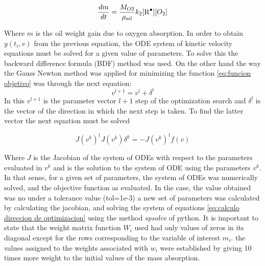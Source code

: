 \begin{refsection}
\begin{equation}
    \frac{dm}{dt} = \frac{M_{O2}}{\rho_{oil}}k_2 [\ce{R^.}][O_2]
    \label{eq:cambio_masa_aceite}
\end{equation}

Where $m$ is the oil weight gain due to oxygen absorption. In order to obtain $y(t_i,v)$ from the previous equation, the ODE system of kinetic velocity equations must be solved for a given value of parameters. To solve this the backward difference formula (BDF) method was used. On the other hand the way the Gauss Newton method was applied for minimizing the function \ref{eq:funcion objetivo} was through the next equation:
\begin{equation}
    v^{l+1}=v^l+\delta^l
\end{equation}
In this $v^{l+1}$ is the parameter vector $l+1$ step of the optimization search and $\delta^l$ is the vector of the direction in which the next step is taken. To find the latter vector the next equation must be solved 

\begin{equation}
    J(v^k)^\dagger J(v^k)\delta^k=-J(v^k)^\dagger f(v)
    \label{eq:calculo direccion de optimizacion}
\end{equation}

Where $J$ is the Jacobian of the system of ODEs with respect to the parameters evaluated in $v^k$ and is the solution to the system of ODE using the parameters $v^k$. In that sense, for a given set of parameters, the system of ODEs was numerically solved, and the objective function as evaluated. In the case, the value obtained was no under a tolerance value (tol=1e-3) a new set of parameters was calculated by calculating the jacobian, and solving the system of equations \ref{eq:calculo direccion de optimizacion} using the method \textit{spsolve} of python. It is important to state that the weight matrix function $W_i$ used had only values of zeros in its diagonal except for the rows corresponding to the variable of interest $m_i$. the values assigned to the weights associated with $w_i$ were established by giving 10 times more weight to the initial values of the mass absorption.


\end{refsection}
